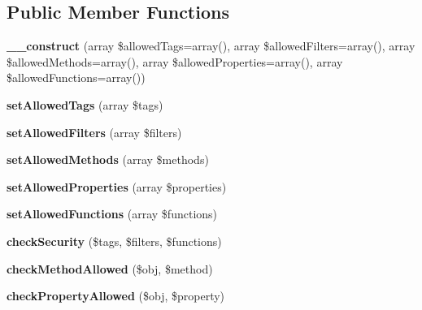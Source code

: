 \subsection*{Public Member Functions}
\begin{DoxyCompactItemize}
\item 
{\bfseries \+\_\+\+\_\+construct} (array \$allowed\+Tags=array(), array \$allowed\+Filters=array(), array \$allowed\+Methods=array(), array \$allowed\+Properties=array(), array \$allowed\+Functions=array())\hypertarget{classTwig__Sandbox__SecurityPolicy_a7d089318461684f5ad971a2a32912a93}{}\label{classTwig__Sandbox__SecurityPolicy_a7d089318461684f5ad971a2a32912a93}

\item 
{\bfseries set\+Allowed\+Tags} (array \$tags)\hypertarget{classTwig__Sandbox__SecurityPolicy_a7fc0e5c6d1592d73e100e3eda774d28b}{}\label{classTwig__Sandbox__SecurityPolicy_a7fc0e5c6d1592d73e100e3eda774d28b}

\item 
{\bfseries set\+Allowed\+Filters} (array \$filters)\hypertarget{classTwig__Sandbox__SecurityPolicy_a287396fb8152ab24fae9257df680dae6}{}\label{classTwig__Sandbox__SecurityPolicy_a287396fb8152ab24fae9257df680dae6}

\item 
{\bfseries set\+Allowed\+Methods} (array \$methods)\hypertarget{classTwig__Sandbox__SecurityPolicy_a77b3c8dc48dcd6220b7f69bd5759a433}{}\label{classTwig__Sandbox__SecurityPolicy_a77b3c8dc48dcd6220b7f69bd5759a433}

\item 
{\bfseries set\+Allowed\+Properties} (array \$properties)\hypertarget{classTwig__Sandbox__SecurityPolicy_a6154f37c7d2d72df8405b27d20156ae9}{}\label{classTwig__Sandbox__SecurityPolicy_a6154f37c7d2d72df8405b27d20156ae9}

\item 
{\bfseries set\+Allowed\+Functions} (array \$functions)\hypertarget{classTwig__Sandbox__SecurityPolicy_a63c08a89b5bd8f9e4b6994dbcba03e20}{}\label{classTwig__Sandbox__SecurityPolicy_a63c08a89b5bd8f9e4b6994dbcba03e20}

\item 
{\bfseries check\+Security} (\$tags, \$filters, \$functions)\hypertarget{classTwig__Sandbox__SecurityPolicy_a1b391afc8d3cc89252ee6146bd04b4c4}{}\label{classTwig__Sandbox__SecurityPolicy_a1b391afc8d3cc89252ee6146bd04b4c4}

\item 
{\bfseries check\+Method\+Allowed} (\$obj, \$method)\hypertarget{classTwig__Sandbox__SecurityPolicy_adeb96cc85777cbd41ea4508d81a8370f}{}\label{classTwig__Sandbox__SecurityPolicy_adeb96cc85777cbd41ea4508d81a8370f}

\item 
{\bfseries check\+Property\+Allowed} (\$obj, \$property)\hypertarget{classTwig__Sandbox__SecurityPolicy_a9d07c7f7330536b8b6e3325d2c3be270}{}\label{classTwig__Sandbox__SecurityPolicy_a9d07c7f7330536b8b6e3325d2c3be270}

\end{DoxyCompactItemize}
